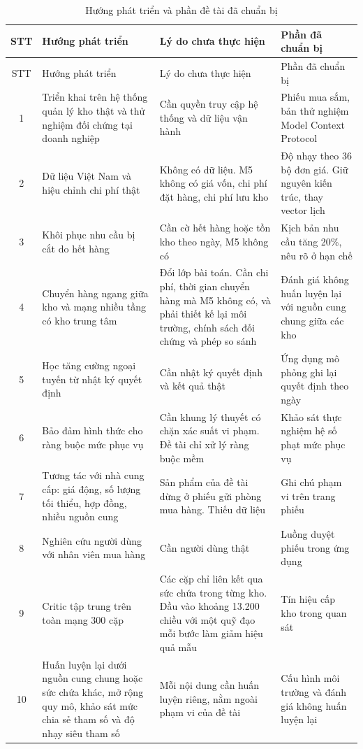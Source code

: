 \begin{longtable}{|c|>{\raggedright\arraybackslash}p{3.9cm}|>{\raggedright\arraybackslash}p{5.1cm}|>{\raggedright\arraybackslash}p{3.8cm}|}
    \caption{Hướng phát triển và phần đề tài đã chuẩn bị}
    \label{tab:huongPhatTrien} \\
    \hline
    STT & Hướng phát triển & Lý do chưa thực hiện & Phần đã chuẩn bị \\
    \hline
    \endfirsthead
    \hline
    STT & Hướng phát triển & Lý do chưa thực hiện & Phần đã chuẩn bị \\
    \hline
    \endhead
    1 & Triển khai trên hệ thống quản lý kho thật và thử nghiệm đối chứng tại doanh nghiệp & Cần quyền truy cập hệ thống và dữ liệu vận hành & Phiếu mua sắm, bản thử nghiệm Model Context Protocol \\ \hline
    2 & Dữ liệu Việt Nam và hiệu chỉnh chi phí thật & Không có dữ liệu. M5 không có giá vốn, chi phí đặt hàng, chi phí lưu kho & Độ nhạy theo 36 bộ đơn giá. Giữ nguyên kiến trúc, thay vector lịch \\ \hline
    3 & Khôi phục nhu cầu bị cắt do hết hàng & Cần cờ hết hàng hoặc tồn kho theo ngày, M5 không có & Kịch bản nhu cầu tăng 20\%, nêu rõ ở hạn chế \\ \hline
    4 & Chuyển hàng ngang giữa kho và mạng nhiều tầng có kho trung tâm & Đổi lớp bài toán. Cần chi phí, thời gian chuyển hàng mà M5 không có, và phải thiết kế lại môi trường, chính sách đối chứng và phép so sánh & Đánh giá không huấn luyện lại với nguồn cung chung giữa các kho \\ \hline
    5 & Học tăng cường ngoại tuyến từ nhật ký quyết định & Cần nhật ký quyết định và kết quả thật & Ứng dụng mô phỏng ghi lại quyết định theo ngày \\ \hline
    6 & Bảo đảm hình thức cho ràng buộc mức phục vụ & Cần khung lý thuyết có chặn xác suất vi phạm. Đề tài chỉ xử lý ràng buộc mềm & Khảo sát thực nghiệm hệ số phạt mức phục vụ \\ \hline
    7 & Tương tác với nhà cung cấp: giá động, số lượng tối thiểu, hợp đồng, nhiều nguồn cung & Sản phẩm của đề tài dừng ở phiếu gửi phòng mua hàng. Thiếu dữ liệu & Ghi chú phạm vi trên trang phiếu \\ \hline
    8 & Nghiên cứu người dùng với nhân viên mua hàng & Cần người dùng thật & Luồng duyệt phiếu trong ứng dụng \\ \hline
    9 & Critic tập trung trên toàn mạng 300 cặp & Các cặp chỉ liên kết qua sức chứa trong từng kho. Đầu vào khoảng 13.200 chiều với một quỹ đạo mỗi bước làm giảm hiệu quả mẫu & Tín hiệu cấp kho trong quan sát \\ \hline
    10 & Huấn luyện lại dưới nguồn cung chung hoặc sức chứa khác, mở rộng quy mô, khảo sát mức chia sẻ tham số và độ nhạy siêu tham số & Mỗi nội dung cần huấn luyện riêng, nằm ngoài phạm vi của đề tài & Cấu hình môi trường và đánh giá không huấn luyện lại \\
    \hline
\end{longtable}
